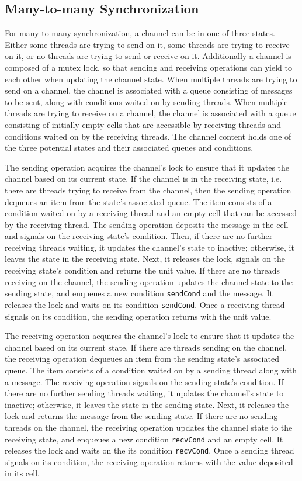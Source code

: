 \documentclass[letterpaper, 11pt]{extarticle}
\begin{document}
\subsection{Many-to-many Synchronization}
For many-to-many synchronization, a channel can be in one of three states.
Either some threads are trying to send on it,
some threads are trying to receive on it, or no threads are trying to send or receive on it.
Additionally a channel is composed of a mutex lock,
so that sending and receiving operations can yield
to each other when updating the channel state. When multiple threads are trying to send on a
channel, the channel is associated with a queue consisting of messages to be sent, along with
conditions waited on by sending threads. When multiple threads are trying to receive on a
channel, the channel is associated with a queue consisting of
initially empty cells that are accessible by receiving threads and
conditions waited on by the receiving threads.
The channel content holds one of the three potential states and their
associated queues and conditions.

The sending operation acquires the channel's lock to
ensure that it updates the channel based on
its current state. If the channel is in the receiving state,
i.e. there are threads trying to receive from the channel,
then the sending operation dequeues an item from the state's associated queue.
The item consists of a condition waited on by a receiving thread and an empty cell
that can be accessed by the receiving thread.
The sending operation deposits the message in the cell and signals on the receiving state's condition.
Then, if there are no further receiving threads waiting, it updates the channel's state to inactive; otherwise,
it leaves the state in the receiving state.
Next, it releases the lock, signals on the receiving state's condition and returns the unit value.
If there are no threads receiving on the
channel, the sending operation updates the channel state to the sending state,
and enqueues a new condition \lstinline{sendCond} and the message.
It releases the lock and waits on its condition \lstinline{sendCond}.
Once a receiving thread signals on its condition, the sending operation returns with the unit value.

The receiving operation acquires the channel's lock
to ensure that it updates the channel based on
its current state. If there are threads
sending on the channel, the receiving 
operation dequeues an item from the sending state's associated queue. The item consists of a condition
waited on by a sending thread along with a message.
The receiving operation signals on the sending state's condition.
If there are no further sending threads waiting, it updates the channel's state to inactive; otherwise,
it leaves the state in the sending state.
Next, it releases the lock and returns the message from the sending state.
If there are no sending threads on the
channel, the receiving operation updates the channel state to the receiving state, and enqueues
a new condition \lstinline{recvCond} and an empty cell. It releases the lock and waits on
the its condition \lstinline{recvCond}. Once a sending thread signals on its condition,
the receiving operation returns with the value deposited in its cell.
\end{document}
